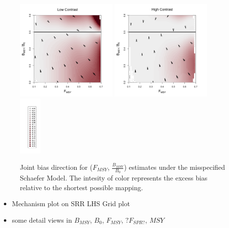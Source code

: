 \documentclass[12pt]{article}
\begin{document}
\begin{figure}[h!]
\includegraphics[width=0.45\textwidth]{../ptNew/directionalBiasSubPTFlatT30.png}
\includegraphics[width=0.45\textwidth]{../ptNew/directionalBiasSubPTExpT45.png}
\hspace*{-1cm}
\includegraphics[width=0.1\textwidth]{../ptNew/subLegnd.png}
\caption{
Joint bias direction for ($F_{MSY}$, $\frac{B_{MSY}}{B_0}$) estimates under the misspecified Schaefer Model. The intesity of color represents the excess bias relative to the shortest possible mapping. 
}
\end{figure}

\begin{itemize}
\item Mechanism plot on SRR LHS Grid plot
\item some detail views in $B_{MSY}$, $B_0$, $F_{MSY}$, $?F_{SPR?}$, $MSY$
\end{itemize}

\clearpage
\end{document}
